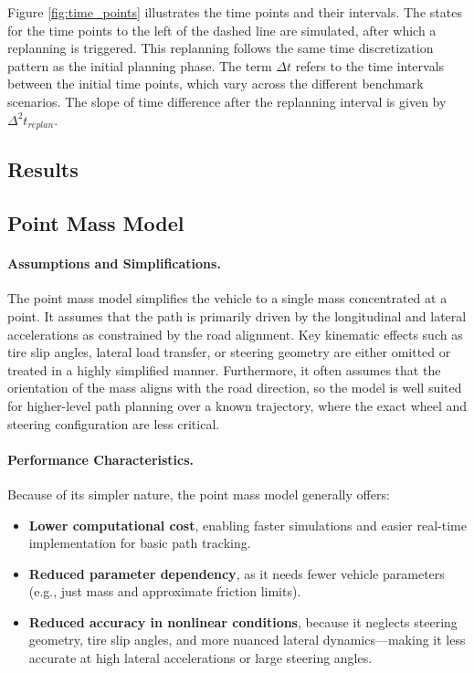 Figure \ref{fig:time_points} illustrates the time points and their intervals.
The states for the time points to the left of the dashed line are simulated, after which a replanning is triggered.
This replanning follows the same time discretization pattern as the initial planning phase.
The term $\Delta t$ refers to the time intervals between the initial time points, which vary across the different benchmark scenarios.
The slope of time difference after the replanning interval is given by $\Delta^2 t_{replan}$.

\subsection{Results}
\label{subsec:results}

\subsection*{Point Mass Model}

\paragraph{Assumptions and Simplifications.}
The point mass model simplifies the vehicle to a single mass concentrated at a point.
It assumes that the path is primarily driven by the longitudinal and lateral accelerations as constrained by the road alignment.
Key kinematic effects such as tire slip angles, lateral load transfer, or steering geometry are either omitted or treated in a highly simplified
manner.
Furthermore, it often assumes that the orientation of the mass aligns with the road direction, so the model is well suited for higher-level path
planning over a known trajectory, where the exact wheel and steering configuration are less critical.

\paragraph{Performance Characteristics.}
Because of its simpler nature, the point mass model generally offers:
\begin{itemize}
	\item \textbf{Lower computational cost}, enabling faster simulations and
	      easier real-time implementation for basic path tracking.
	\item \textbf{Reduced parameter dependency}, as it needs fewer vehicle
	      parameters (e.g., just mass and approximate friction limits).
	\item \textbf{Reduced accuracy in nonlinear conditions}, because it neglects
	      steering geometry, tire slip angles, and more nuanced lateral
	      dynamics---making it less accurate at high lateral accelerations
	      or large steering angles.
\end{itemize}

